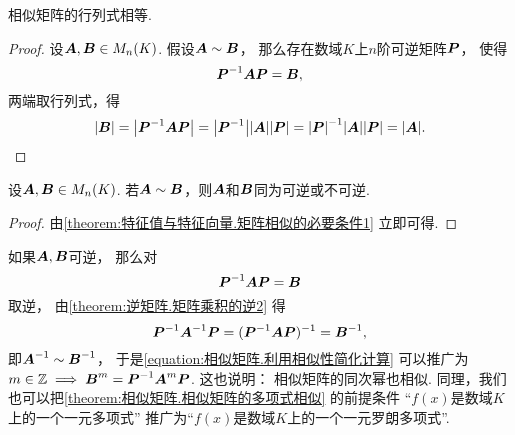 \begin{property}\label{theorem:特征值与特征向量.矩阵相似的必要条件1}
相似矩阵的行列式相等.
\begin{proof}
设\(\boldsymbol{A},\boldsymbol{B} \in M_n(K)\).
假设\(\boldsymbol{A}\sim\boldsymbol{B}\)，
那么存在数域\(K\)上\(n\)阶可逆矩阵\(\boldsymbol{P}\)，
使得\[
	\boldsymbol{P}^{-1}\boldsymbol{A}\boldsymbol{P}=\boldsymbol{B},
\]
两端取行列式，得\[
	\abs{\boldsymbol{B}} = \abs{\boldsymbol{P}^{-1}\boldsymbol{A}\boldsymbol{P}}
	= \abs{\boldsymbol{P}^{-1}}\abs{\boldsymbol{A}}\abs{\boldsymbol{P}}
	= \abs{\boldsymbol{P}}^{-1}\abs{\boldsymbol{A}}\abs{\boldsymbol{P}}
	= \abs{\boldsymbol{A}}.
	\qedhere
\]
\end{proof}
\end{property}
\begin{proposition}
设\(\boldsymbol{A},\boldsymbol{B} \in M_n(K)\).
若\(\boldsymbol{A}\sim\boldsymbol{B}\)，则\(\boldsymbol{A}\)和\(\boldsymbol{B}\)同为可逆或不可逆.
\begin{proof}
由\cref{theorem:特征值与特征向量.矩阵相似的必要条件1} 立即可得.
\end{proof}
\end{proposition}
\begin{remark}
如果\(\boldsymbol{A},\boldsymbol{B}\)可逆，
那么对\[
	\boldsymbol{P}^{-1} \boldsymbol{A} \boldsymbol{P} = \boldsymbol{B}
\]取逆，
由\cref{theorem:逆矩阵.矩阵乘积的逆2} 得\[
	\boldsymbol{P}^{-1} \boldsymbol{A}^{-1} \boldsymbol{P}
	= (\boldsymbol{P}^{-1} \boldsymbol{A} \boldsymbol{P})^{-1}
	= \boldsymbol{B}^{-1},
\]
即\(\boldsymbol{A}^{-1} \sim \boldsymbol{B}^{-1}\)，
于是\cref{equation:相似矩阵.利用相似性简化计算}
可以推广为\(m\in\mathbb{Z} \implies \boldsymbol{B}^m = \boldsymbol{P}^{-1}\boldsymbol{A}^m\boldsymbol{P}\).
这也说明：
相似矩阵的同次幂也相似.
同理，我们也可以把\cref{theorem:相似矩阵.相似矩阵的多项式相似} 的前提条件
“\(f(x)\)是数域\(K\)上的一个一元多项式”
推广为“\(f(x)\)是数域\(K\)上的一个一元罗朗多项式”.
\end{remark}

